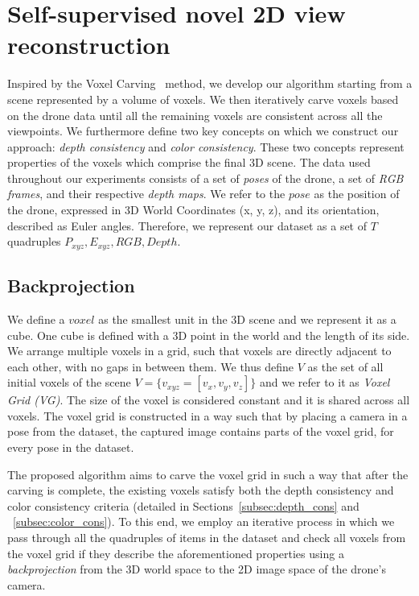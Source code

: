 \documentclass{article}
\begin{document}
\section{Self-supervised novel 2D view reconstruction} \label{sec:method}

Inspired by the Voxel Carving~\cite{kutulakos2000theory} method, we develop our algorithm starting from a scene represented by a volume of voxels. We then iteratively carve voxels based on the drone data until all the remaining voxels are consistent across all the viewpoints. We furthermore define two key concepts on which we construct our approach: \textit{depth consistency} and \textit{color consistency}. These two concepts represent properties of the voxels which comprise the final 3D scene.
The data used throughout our experiments consists of a set of \textit{poses} of the drone, a set of \textit{RGB frames}, and their respective \textit{depth  maps}. We refer to the \(pose\) as the position of the drone, expressed in 3D World Coordinates (x, y, z), and its orientation, described as Euler angles. Therefore, we represent our dataset as a set of \(T\) quadruples \(P_{xyz}, E_{xyz}, RGB, Depth\).

\subsection{Backprojection}\label{subsec:backproj}

We define a $voxel$ as the smallest unit in the 3D scene and we represent it as a cube. One cube is defined with a 3D point in the world and the length of its side. We arrange multiple voxels in a grid, such that voxels are directly adjacent to each other, with no gaps in between them. We thus define \(V\) as the set of all initial voxels of the scene \(V = \{v_{xyz} = [v_x, v_y, v_z]\}\) and we refer to it as \textit{Voxel Grid (VG)}. The size of the voxel is considered constant and it is shared across all voxels. The voxel grid is constructed in a way such that by placing a camera in a pose from the dataset, the captured image contains parts of the voxel grid, for every pose in the dataset.

The proposed algorithm aims to carve the voxel grid in such a way that after the carving is complete, the existing voxels satisfy both the depth consistency and color consistency criteria (detailed in Sections~\ref{subsec:depth_cons} and ~\ref{subsec:color_cons}). To this end, we employ an iterative process in which we pass through all the quadruples of items in the dataset and check all voxels from the voxel grid if they describe the aforementioned properties using a \textit{backprojection} from the 3D world space to the 2D image space of the drone's camera.
\end{document}
